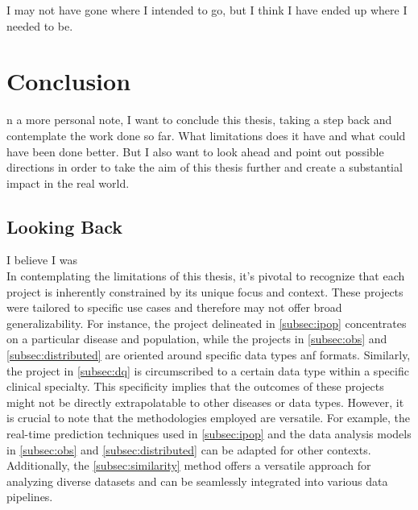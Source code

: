 

\begin{savequote}[75mm]
I may not have gone where I intended to go,
but I think I have ended up where I needed to be.

\end{savequote}

\chapter{Conclusion} \label{chap:conclusion}
n a more personal note, I want to conclude this thesis, taking a step back and contemplate the work done so far. What limitations does it have and what could have been done better.
But I also want to look ahead and point out possible directions in order to take the aim of this thesis further and create a substantial impact in the real world.

\section{Looking Back}
I believe I was \\
In contemplating the limitations of this thesis, it's pivotal to recognize that each project is inherently constrained by its unique focus and context. These projects were tailored to specific use cases and therefore may not offer broad generalizability. For instance, the project delineated in \ref{subsec:ipop} concentrates on a particular disease and population, while the projects in \ref{subsec:obs} and \ref{subsec:distributed} are oriented around specific data types anf formats. Similarly, the project in \ref{subsec:dq} is circumscribed to a certain data type within a specific clinical specialty. This specificity implies that the outcomes of these projects might not be directly extrapolatable to other diseases or data types. However, it is crucial to note that the methodologies employed are versatile. For example, the real-time prediction techniques used in \ref{subsec:ipop} and the data analysis models in \ref{subsec:obs} and \ref{subsec:distributed} can be adapted for other contexts. Additionally, the \ref{subsec:similarity} method offers a versatile approach for analyzing diverse datasets and can be seamlessly integrated into various data pipelines.



